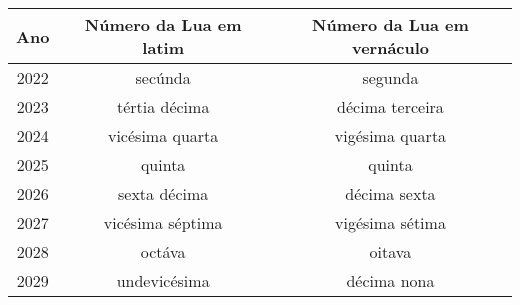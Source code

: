 \frontmatter

\tableofcontents



\mainmatter

\label{chapter:tempus-adventus}

\label{section:tempus-adventus/missa-1}


\label{section:tempus-adventus/missa-2}


\label{chapter:tempus-nativitatis}

\label{section:tempus-nativitatis/in-nativitatis-domini}


\label{section:tempus-nativitatis/sanctae-familiae}


\label{section:tempus-nativitatis/sanctae-dei-genetricis-mariae}


\label{section:tempus-nativitatis/in-epiphania-domini}


\label{section:tempus-nativitatis/in-baptismate-domini}


\appendix

\label{appendix}

\label{appendix:kalenda}
\begin{center}
  \begin{tabular}{|c|c|c|}
    \hline
    Ano & Número da Lua em latim & Número da Lua em vernáculo \\
    \hline
    \hline
    2022 & secúnda & segunda \\
    2023 & tértia décima & décima terceira \\
    2024 & vicésima quarta & vigésima quarta \\
    2025 & quinta & quinta \\
    2026 & sexta décima & décima sexta \\
    2027 & vicésima séptima & vigésima sétima \\
    2028 & octáva & oitava \\
    2029 & undevicésima & décima nona \\
    \hline
    \hline
  \end{tabular}
\end{center}

